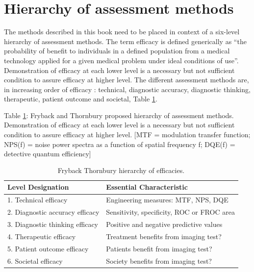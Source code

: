 \documentclass[
]{book}
\begin{document}
\hypertarget{hierarchy-of-assessment-methods}{%
\section{Hierarchy of assessment methods}\label{hierarchy-of-assessment-methods}}

The methods described in this book need to be placed in context of a six-level hierarchy of assessment methods\citep[\citet{fryback1991efficacy}]{kundel2008receiver}. The term efficacy is defined generically as ``the probability of benefit to individuals in a defined population from a medical technology applied for a given medical problem under ideal conditions of use''. Demonstration of efficacy at each lower level is a necessary but not sufficient condition to assure efficacy at higher level. The different assessment methods are, in increasing order of efficacy : technical, diagnostic accuracy, diagnostic thinking, therapeutic, patient outcome and societal, Table \ref{tab:fryback-thornbury}.

Table \ref{tab:fryback-thornbury}: Fryback and Thornbury proposed hierarchy of assessment methods. Demonstration of efficacy at each lower level is a necessary but not sufficient condition to assure efficacy at higher level. {[}MTF = modulation transfer function; NPS(f) = noise power spectra as a function of spatial frequency f; DQE(f) = detective quantum efficiency{]}

\begin{table}

\caption{\label{tab:fryback-thornbury}Fryback Thornbury hierarchy of efficacies.}
\centering
\begin{tabular}[t]{l|l}
\hline
Level Designation & Essential Characteristic\\
\hline
1. Technical efficacy & Engineering measures: MTF, NPS, DQE\\
\hline
2. Diagnostic accuracy efficacy & Sensitivity, specificity, ROC or FROC area\\
\hline
3. Diagnostic thinking efficacy & Positive and negative predictive values\\
\hline
4. Therapeutic efficacy & Treatment benefits from imaging test?\\
\hline
5. Patient outcome efficacy & Patients benefit from imaging test?\\
\hline
6. Societal efficacy & Society benefits from imaging test?\\
\hline
\end{tabular}
\end{table}
\end{document}
